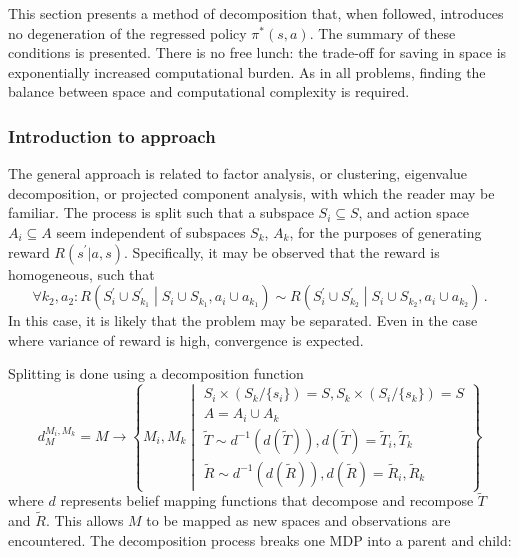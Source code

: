 This section presents a method of decomposition that, when followed, introduces no degeneration of the regressed policy $\pi^{*}(s,a)$.
The summary of these conditions is presented. There is no free lunch: the trade-off for saving in space is exponentially increased computational burden. As in all problems, finding the balance between space and computational complexity is required.

 

\subsubsection{Introduction to approach}

The general approach is related to factor analysis, or clustering, eigenvalue decomposition, or projected component analysis, with which the reader may be familiar. The process is split such that a subspace $S_i \subseteq S$, and action space $A_i \subseteq A$ seem independent of subspaces $S_k$, $A_k$, for the purposes of generating reward $R(s^\prime|a,s)$. Specifically, it may be observed that the reward is homogeneous, such that 
\begin{equation*}
\forall k_2, a_2: R\left(S^\prime_i \cup  S^\prime_{k_1} \middle| S_i \cup S_{k_1} , a_i \cup a_{k_1} \right) \sim R\left( S^\prime_i \cup S^\prime_{k_2}  \middle|  S_i \cup S_{k_2} , a_i \cup a_{k_2}  \right)\,.
\end{equation*}
In this case, it is likely that the problem may be separated. Even in the case where variance of reward is high, convergence is expected.

Splitting is done using a decomposition function
\begin{equation*}
d^{M_i,M_k}_{M} = M \longrightarrow \left\{    M_i, M_k \middle|
\begin{array}{l}
S_i \times ( S_k / \{s_i\} ) = S, S_k \times ( S_i / \{ s_k \} ) = S \\
A=A_i \cup A_k\\
\tilde{T}\sim d^{-1}(d(\tilde{T})),d(\tilde{T})=\tilde{T}_i, \tilde{T}_k\\
\tilde{R}\sim d^{-1}(d(\tilde{R})), d(\tilde{R})=\tilde{R}_i,\tilde{R}_k
\end{array}
 \right\}
\end{equation*}
where $d$ represents belief mapping functions that decompose and recompose $\tilde{T}$ and $\tilde{R}$. This allows  $M$ to be mapped as new spaces and observations are encountered. The decomposition process breaks one MDP into a parent and child:\\

